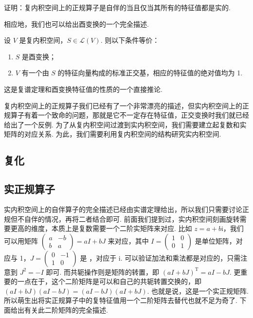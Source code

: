 \begin{example}
    证明：复内积空间上的正规算子是自伴的当且仅当其所有的特征值都是实的.
\end{example}

相应地，我们也可以给出酉变换的一个完全描述.

\begin{theorem}
    设 $ V $ 是复内积空间，$ S \in \mathcal{L}(V) $. 则以下条件等价：
    \begin{enumerate}
        \item $ S $ 是酉变换；

        \item $ V $ 有一个由 $ S $ 的特征向量构成的标准正交基，相应的特征值的绝对值均为 1.
    \end{enumerate}
\end{theorem}

这是复谱定理和酉变换特征值的性质的一个直接推论.

复内积空间上的正规算子我们已经有了一个非常漂亮的描述，但实内积空间上的正规算子有着一个致命的问题，那就是它不一定存在特征值，正交变换时我们就已经给出了一个反例. 为了从复内积空间过渡到实内积空间，我们需要建立起复数和实矩阵的对应关系. 为此，我们需要利用复内积空间的结构研究实内积空间.

\subsection{复化}

\subsection{实正规算子}

实内积空间上的自伴算子的完全描述已经由实谱定理给出，所以我们只需要讨论正规但不自伴的情况，再将二者结合即可. 前面我们提到过，实内积空间刻画旋转需要更高的维度，本质上是复数需要一个二阶实矩阵来对应. 比如 $ z = a + b\mathrm{i} $，我们可以用矩阵 $ \begin{pmatrix} a & -b \\ b & a \end{pmatrix} = aI + bJ $ 来对应，其中 $ I = \begin{pmatrix} 1 & 0 \\ 0 & 1 \end{pmatrix} $ 是单位矩阵，对应与 1，$ J = \begin{pmatrix} 0 & -1 \\ 1 & 0 \end{pmatrix} $ 是 ，对应于 $ \mathrm{i} $. 可以验证加法和乘法都是对应的，只需注意到 $ J^2 = -I $ 即可. 而共轭操作则是矩阵的转置，即 $ (aI + bJ)^{\mathrm{T}} = aI - bJ $. 更重要的一点在于，这个二阶矩阵是可以和自己的共轭转置交换的，即 $ (aI + bJ)(aI - bJ) = (aI - bJ)(aI + bJ) $. 也就是说，这是一个实正规矩阵. 所以萌生出将实正规算子中的复特征值用一个二阶矩阵去替代也就不足为奇了. 下面给出有关此二阶矩阵的完全描述.

